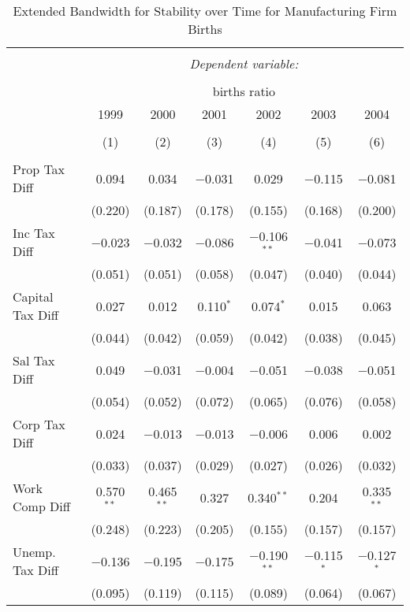 
\begin{table}[!htbp] \centering 
  \caption{Extended Bandwidth for Stability over Time for  Manufacturing Firm Births} 
  \label{31-33 ebyear} 
\small 
\begin{tabular}{@{\extracolsep{5pt}}lcccccc} 
\\[-1.8ex]\hline 
\hline \\[-1.8ex] 
 & \multicolumn{6}{c}{\textit{Dependent variable:}} \\ 
\cline{2-7} 
\\[-1.8ex] & \multicolumn{6}{c}{births ratio} \\ 
 & 1999 & 2000 & 2001 & 2002 & 2003 & 2004 \\ 
\\[-1.8ex] & (1) & (2) & (3) & (4) & (5) & (6)\\ 
\hline \\[-1.8ex] 
 Prop Tax Diff & 0.094 & 0.034 & $-$0.031 & 0.029 & $-$0.115 & $-$0.081 \\ 
  & (0.220) & (0.187) & (0.178) & (0.155) & (0.168) & (0.200) \\ 
  Inc Tax Diff & $-$0.023 & $-$0.032 & $-$0.086 & $-$0.106$^{**}$ & $-$0.041 & $-$0.073 \\ 
  & (0.051) & (0.051) & (0.058) & (0.047) & (0.040) & (0.044) \\ 
  Capital Tax Diff & 0.027 & 0.012 & 0.110$^{*}$ & 0.074$^{*}$ & 0.015 & 0.063 \\ 
  & (0.044) & (0.042) & (0.059) & (0.042) & (0.038) & (0.045) \\ 
  Sal Tax Diff & 0.049 & $-$0.031 & $-$0.004 & $-$0.051 & $-$0.038 & $-$0.051 \\ 
  & (0.054) & (0.052) & (0.072) & (0.065) & (0.076) & (0.058) \\ 
  Corp Tax Diff & 0.024 & $-$0.013 & $-$0.013 & $-$0.006 & 0.006 & 0.002 \\ 
  & (0.033) & (0.037) & (0.029) & (0.027) & (0.026) & (0.032) \\ 
  Work Comp Diff & 0.570$^{**}$ & 0.465$^{**}$ & 0.327 & 0.340$^{**}$ & 0.204 & 0.335$^{**}$ \\ 
  & (0.248) & (0.223) & (0.205) & (0.155) & (0.157) & (0.157) \\ 
  Unemp. Tax Diff & $-$0.136 & $-$0.195 & $-$0.175 & $-$0.190$^{**}$ & $-$0.115$^{*}$ & $-$0.127$^{*}$ \\ 
  & (0.095) & (0.119) & (0.115) & (0.089) & (0.064) & (0.067) \\ 

\end{tabular}
\end{table}
